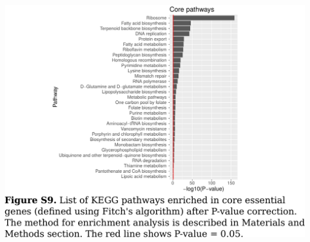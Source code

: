 \documentclass{article}
\newcommand{\Newpage}{\end{preview}\begin{preview}}
\begin{document}
\begin{preview}
\includegraphics{suppl9.pdf}
\Newpage

\end{preview}
\end{document}
